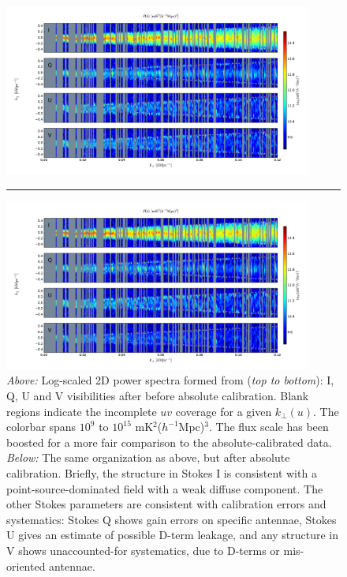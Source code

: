 \begin{figure}
\centering
\includegraphics[width=0.9\textwidth]{chapters/eor_window_PAPER/figures/oldcal_forks_lines.pdf}
\noindent\rule{14cm}{0.6pt}
\includegraphics[width=0.9\textwidth]{chapters/eor_window_PAPER/figures/newcal_forks_lines.pdf}
\caption[Log-scaled 2D power spectra from PAPER-32.]{\textit{Above:} Log-scaled 2D power spectra formed from (\textit{top to bottom}): I, Q, U and V visibilities after before absolute calibration. Blank regions indicate the incomplete $uv$ coverage for a given $k_{\perp}(u)$. 
The colorbar spans $10^{9}$ to $10^{15}$ mK$^2$($h^{-1}$Mpc)$^3$. The flux scale has been boosted for a more fair comparison to the absolute-calibrated data.
\textit{Below:} The same organization as above, but after absolute calibration.
Briefly, the structure in Stokes I is consistent with a point-source-dominated field with a weak diffuse component. The other Stokes parameters are consistent with calibration errors and systematics: Stokes Q shows gain errors on specific antennae, Stokes U gives an estimate of possible D-term leakage, and any structure in V shows unaccounted-for systematics, due to D-terms or mis-oriented antennae.}
\label{fig:psa32_forks}
\end{figure}

